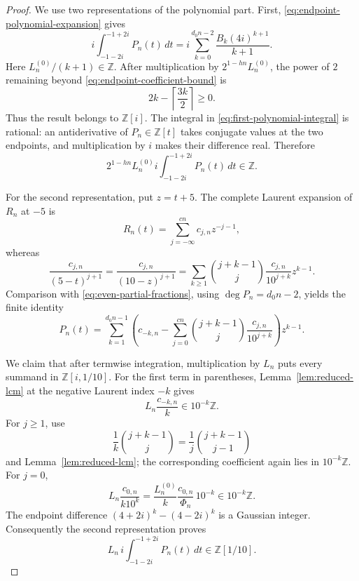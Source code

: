 \documentclass[11pt,reqno,letterpaper]{amsart}
\numberwithin{equation}{section}
\theoremstyle{definition}
\theoremstyle{remark}
\begin{document}
\begin{proof}
We use two representations of the polynomial part.  First,
\eqref{eq:endpoint-polynomial-expansion} gives
\begin{equation}\label{eq:first-polynomial-integral}
 i\int_{-1-2i}^{-1+2i}P_n(t)\,dt
 =i\sum_{k=0}^{d_0n-2}\frac{B_k(4i)^{k+1}}{k+1}.
\end{equation}
Here $L_n^{(0)}/(k+1)\in\mathbb Z$.  After multiplication by
$2^{1-hn}L_n^{(0)}$, the power of $2$ remaining beyond
\eqref{eq:endpoint-coefficient-bound} is
\[
 2k-\left\lceil\frac{3k}{2}\right\rceil\geq0.
\]
Thus the result belongs to $\mathbb Z[i]$.  The integral in
\eqref{eq:first-polynomial-integral} is rational: an antiderivative of
$P_n\in\mathbb Z[t]$ takes conjugate values at the two endpoints, and
multiplication by $i$ makes their difference real.  Therefore
\begin{equation}\label{eq:polynomial-first-inclusion}
 2^{1-hn}L_n^{(0)}i\int_{-1-2i}^{-1+2i}P_n(t)\,dt\in\mathbb Z.
\end{equation}

For the second representation, put $z=t+5$.  The complete Laurent
expansion of $R_n$ at $-5$ is
\[
 R_n(t)=\sum_{j=-\infty}^{cn}c_{j,n}z^{-j-1},
\]
whereas
\[
 \frac{c_{j,n}}{(5-t)^{j+1}}
 =\frac{c_{j,n}}{(10-z)^{j+1}}
 =\sum_{k\geq1}\binom{j+k-1}{j}
   \frac{c_{j,n}}{10^{j+k}}z^{k-1}.
\]
Comparison with \eqref{eq:even-partial-fractions}, using
$\deg P_n=d_0n-2$, yields the finite identity
\begin{equation}\label{eq:second-polynomial-representation}
 P_n(t)=\sum_{k=1}^{d_0n-1}\left(
 c_{-k,n}-\sum_{j=0}^{cn}\binom{j+k-1}{j}
 \frac{c_{j,n}}{10^{j+k}}\right)z^{k-1}.
\end{equation}

We claim that after termwise integration, multiplication by $L_n$ puts
every summand in $\mathbb Z[i,1/10]$.  For the first term in parentheses,
Lemma~\ref{lem:reduced-lcm} at the negative Laurent index $-k$ gives
\[
 L_n\frac{c_{-k,n}}k\in10^{-k}\mathbb Z.
\]
For $j\geq1$, use
\begin{equation}\label{eq:binomial-denominator-transfer}
 \frac1k\binom{j+k-1}{j}
 =\frac1j\binom{j+k-1}{j-1}
\end{equation}
and Lemma~\ref{lem:reduced-lcm}; the corresponding coefficient again
lies in $10^{-k}\mathbb Z$.  For $j=0$,
\[
 L_n\frac{c_{0,n}}{k10^k}
 =\frac{L_n^{(0)}}k\frac{c_{0,n}}{\Phi_n}\,10^{-k}
 \in10^{-k}\mathbb Z.
\]
The endpoint difference $(4+2i)^k-(4-2i)^k$ is a Gaussian integer.
Consequently the second representation proves
\begin{equation}\label{eq:polynomial-second-inclusion}
 L_n\,i\int_{-1-2i}^{-1+2i}P_n(t)\,dt
 \in\mathbb Z[1/10].
\end{equation}


\end{proof}
\end{document}
